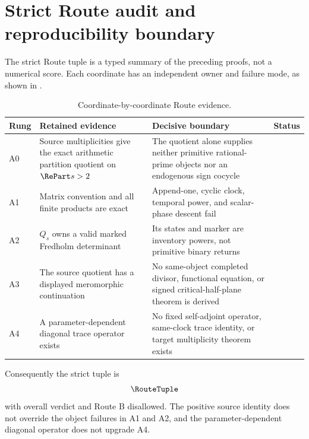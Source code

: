 \section{Strict Route audit and reproducibility boundary}
\label{sec:route}

The strict Route tuple is a typed summary of the preceding proofs, not a
numerical score.  Each coordinate has an independent owner and failure mode,
as shown in .

\begin{table}[htbp]
\centering
\caption{Coordinate-by-coordinate Route evidence.}
\label{tab:route-map}
\small
\renewcommand{\arraystretch}{1.08}
\begin{tabularx}{\textwidth}{@{}P{.06\textwidth}P{.29\textwidth}YP{.20\textwidth}@{}}
\toprule
Rung & Retained evidence & Decisive boundary & Status \\
\midrule
A0 & Source multiplicities give the exact arithmetic partition quotient on
$\RePart s>2$ & The quotient alone supplies neither primitive rational-prime
objects nor an endogenous sign cocycle &
\newline{} \\
A1 & Matrix convention and all finite products are exact & Append-one,
cyclic clock, temporal power, and scalar-phase descent fail &
 \\
A2 & $Q_s$ owns a valid marked Fredholm determinant & Its states and marker
are inventory powers, not primitive binary returns &
 \\
A3 & The source quotient has a displayed meromorphic continuation & No
same-object completed divisor, functional equation, or signed
critical-half-plane theorem is derived &
\newline{}\newline{} \\
A4 & A parameter-dependent diagonal trace operator exists & No fixed
self-adjoint operator, same-clock trace identity, or target multiplicity
theorem exists &
 \\
\bottomrule
\end{tabularx}
\end{table}

Consequently the strict tuple is
\[
 \RouteTuple
\]
with overall verdict  and Route B disallowed.  The
positive source identity does not override the object failures in A1 and A2,
and the parameter-dependent diagonal operator does not upgrade A4.

